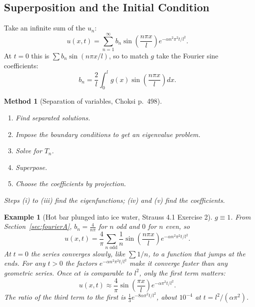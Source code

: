 \documentclass{article}
\newtheorem*{example}{Example}
\newtheorem{method}{Method}
\begin{document}
\subsection{Superposition and the Initial Condition}
Take an infinite sum of the $u_n$:
\begin{equation}\label{eq:heat-series}
    u(x,t) = \sum_{n=1}^\infty b_n\sin\left(\frac{n\pi x}{l}\right)e^{-\alpha n^2\pi^2t/l^2}.
\end{equation}
At $t = 0$ this is $\sum b_n\sin(n\pi x/l)$, so to match $g$ take the Fourier sine coefficients:
\begin{equation}\label{eq:heat-coeff}
    b_n = \frac{2}{l}\int_0^l g(x)\sin\left(\frac{n\pi x}{l}\right)dx.
\end{equation}
\begin{method}[Separation of variables, Choksi p.~498]
    \begin{enumerate}[label=(\roman*)]
        \item Find separated solutions.
        \item Impose the boundary conditions to get an eigenvalue problem.
        \item Solve for $T_n$.
        \item Superpose.
        \item Choose the coefficients by projection.
    \end{enumerate}
    Steps (i) to (iii) find the eigenfunctions; (iv) and (v) find the coefficients.
\end{method}
\begin{example}[Hot bar plunged into ice water, Strauss 4.1 Exercise 2]
    $g \equiv 1$. From Section~\ref{sec:fourierA}, $b_n = \frac{4}{n\pi}$ for $n$ odd and $0$ for $n$ even, so
    \begin{equation}
        u(x,t) = \frac{4}{\pi}\sum_{n \text{ odd}}\frac1n\sin\left(\frac{n\pi x}{l}\right)e^{-\alpha n^2\pi^2t/l^2}.
    \end{equation}
    At $t = 0$ the series converges slowly, like $\sum 1/n$, to a function that jumps at the ends. For any $t > 0$ the factors $e^{-\alpha n^2\pi^2t/l^2}$ make it converge faster than any geometric series. Once $\alpha t$ is comparable to $l^2$, only the first term matters:
    \begin{equation}
        u(x,t) \approx \frac{4}{\pi}\sin\left(\frac{\pi x}{l}\right)e^{-\alpha\pi^2t/l^2}.
    \end{equation}
    The ratio of the third term to the first is $\frac13e^{-8\alpha\pi^2t/l^2}$, about $10^{-4}$ at $t = l^2/(\alpha\pi^2)$.
\end{example}
\end{document}
